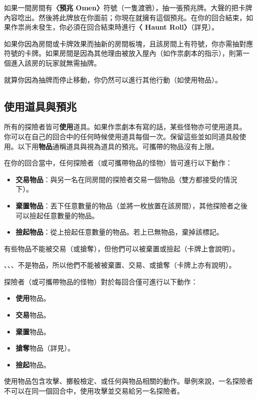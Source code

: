 如果一間房間有\textbf{〈預兆 Omen〉}符號（一隻渡鴉\OmenSymbol{}），抽一張預兆牌。大聲的把卡牌內容唸出。然後將此牌放在你面前；你現在就擁有這個預兆。在你的回合結束，如果作祟尚未發生，你必須在回合結束時進行\textbf{〈 Haunt Roll〉}（詳見）。

如果你因為房間或卡牌效果而抽新的房間板塊，且該房間上有符號，你亦需抽對應符號的卡牌。如果房間是因為其他理由被放入屋內（如作祟劇本的指示），則第一個進入該房的玩家就無需抽牌。

就算你因為抽牌而停止移動，你仍然可以進行其他行動（如使用物品）。


\subsection{使用道具與預兆} \label{ssec:use-item-and-omen-cards}

所有的探險者皆可\textbf{使用}道具。如果作祟劇本有寫的話，某些怪物亦可使用道具。
你可以在自己的回合中的任何時候使用道具每個一次。保留這些並如同道具般使用。以下用\textbf{物品}通稱道具與視為道具的預兆。可攜帶的物品沒有上限。

在你的回合當中，任何探險者（或可攜帶物品的怪物）皆可進行以下動作：
\begin{itemize}
	\item \textbf{交易物品}：與另一名在同房間的探險者交易一個物品（雙方都接受的情況下）。
	\item \textbf{棄置物品}：丟下任意數量的物品（並將一枚放置在該房間），其他探險者之後可以撿起任意數量的物品。
	\item \textbf{撿起物品}：從上撿起任意數量的物品。若上已無物品，棄掉該標記。
\end{itemize}
有些物品不能被交易（或搶奪），但他們可以被棄置或撿起（卡牌上會說明）。

、、、不是物品，所以他們不能被被棄置、交易、或搶奪（卡牌上亦有說明）。

探險者（或可攜帶物品的怪物）對於每回合僅可進行以下動作：
\begin{itemize}
	\item \textbf{使用}物品。
	\item \textbf{交易}物品。
	\item \textbf{棄置}物品。
	\item \textbf{搶奪}物品（詳見）。
	\item \textbf{撿起}物品。
\end{itemize}
使用物品包含攻擊、擲骰檢定、或任何與物品相關的動作。舉例來說，一名探險者不可以在同一個回合中，使用攻擊並交易給另一名探險者。

